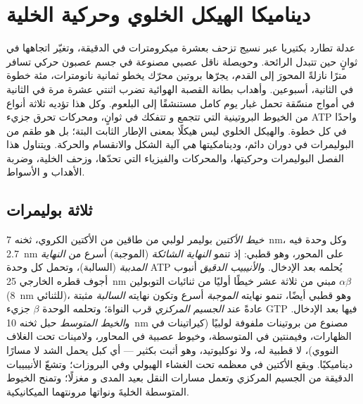 \chapter{ديناميكا الهيكل الخلوي وحركية الخلية}\label{ch:b3:cytoskeleton-motility}

عدلة تطارد بكتيريا عبر نسيج تزحف بعشرة
ميكرومترات في الدقيقة، وتغيّر اتجاهها في ثوانٍ حين تتبدل
الرائحة. وحويصلة ناقل عصبي مصنوعة في جسم عصبون
حركي تسافر مترًا نازلةً المحورَ إلى القدم، يجرّها بروتين
محرّك يخطو ثمانية نانومترات، مئة خطوة في الثانية،
أسبوعين. وأهداب بطانة القصبة الهوائية تضرب اثنتي عشرة مرة في الثانية في
أمواج منسّقة تحمل غبار يوم كامل مستنشقًا إلى البلعوم. وكل
هذا تؤديه ثلاثة أنواع من الخيوط البروتينية التي تتجمع و
تتفكك في ثوانٍ، ومحركات تحرق جزيء ATP واحدًا في كل
خطوة. والهيكل الخلوي ليس هيكلًا بمعنى الإطار
الثابت البتة؛ بل هو طقم من البوليمرات في دوران دائم، ودينامكيتها
\emph{هي} آلية الشكل والانقسام والحركة. ويتناول هذا الفصل
البوليمرات وحركيتها، والمحركات والفيزياء التي
تحدّها، وزحف الخلية، وضربة الأهداب و
الأسواط.

\section{ثلاثة بوليمرات}

\begin{definition}\label{def:b3:cytoskeleton-motility:filaments}
\emph{خيط الأكتين} بوليمر لولبي من طاقين من الأكتين
الكروي، ثخنه \qty{7}{nm}، وكل وحدة فيه \qty{2.7}{nm} على المحور،
وهو قطبي: إذ تنمو \emph{النهاية الشائكة} (الموجبة) أسرع من \emph{النهاية
المدببة} (السالبة)، وتحمل كل وحدة ATP يُحلمه بعد
الإدخال. و\emph{الأنيبيب الدقيق} أنبوب أجوف قطره الخارجي
\qty{25}{nm} مبني من ثلاثة عشر خيطًا أوليًا من ثنائيات التوبولين
$\alpha\beta$ (\qty{8}{nm} للثنائي)، وهو قطبي أيضًا، تنمو نهايته \emph{الموجبة}
أسرع وتكون نهايته \emph{السالبة} مثبتة عادةً عند
\emph{الجسيم المركزي} قرب النواة؛ وتحلمه الوحدة $\beta$
جزيء GTP فيها بعد الإدخال. و\emph{الخيط المتوسط} حبل
ثخنه \qty{10}{nm} مصنوع من بروتينات ملفوفة لولبيًا (كيراتينات في الظهارات،
وفيمنتين في المتوسطة، وخيوط عصبية في المحاور، ولامينات تحت
الغلاف النووي)، لا قطبية له، ولا نوكليوتيد، وهو أثبت بكثير ---
أي كبل يحمل الشد لا مسارًا ديناميكيًا. ويقع الأكتين في معظمه
تحت الغشاء الهيولي وفي البروزات؛ وتشعّ الأنيبيبات الدقيقة من
الجسيم المركزي وتعمل مسارات النقل بعيد المدى و
مغزلًا؛ وتمنح الخيوط المتوسطة الخليةَ ونواتها
مرونتهما الميكانيكية.
\end{definition}

